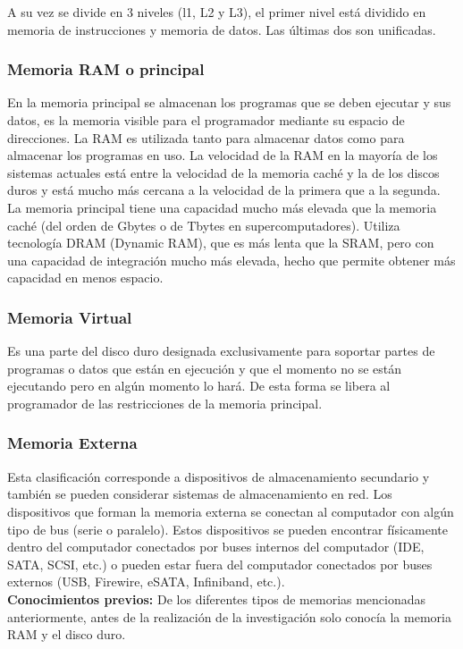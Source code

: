 \documentclass{article}
\begin{document}
A su vez se divide en 3 niveles (l1, L2 y L3), el primer nivel está dividido en memoria de instrucciones y memoria de datos. Las últimas dos son unificadas.

\subsubsection{Memoria RAM o principal}
En la memoria principal se almacenan los programas que se deben ejecutar y sus datos, es la memoria visible para el programador mediante su espacio de direcciones.
La RAM es utilizada tanto para almacenar datos como para almacenar los programas en uso. La velocidad de la RAM en la mayoría de los sistemas actuales está entre la velocidad de la memoria caché y la de los discos duros y está mucho más cercana a la velocidad de la primera que a la segunda.\cite{MIT} \break
La memoria principal tiene una capacidad mucho más elevada que la memoria caché (del orden de Gbytes o de Tbytes en supercomputadores). Utiliza tecnología DRAM (Dynamic RAM), que es más lenta que la SRAM, pero con una capacidad de integración mucho más elevada, hecho que permite obtener más capacidad en menos espacio.\cite{Estructura}

\subsubsection{Memoria Virtual}
Es una parte del disco duro designada exclusivamente para soportar partes de programas o datos que están en ejecución y que el momento no se están ejecutando pero en algún momento lo hará. De esta forma se libera al programador de las restricciones de la memoria principal.

\subsubsection{Memoria Externa}
Esta clasificación corresponde a dispositivos de almacenamiento secundario y también se pueden considerar sistemas de almacenamiento en red. Los dispositivos que forman la memoria externa se conectan al computador con algún tipo de bus (serie o paralelo). Estos dispositivos se pueden encontrar físicamente dentro del computador conectados por buses internos del computador (IDE, SATA, SCSI, etc.) o pueden estar fuera del computador conectados por buses externos (USB, Firewire, eSATA, Infiniband, etc.).\cite{Estructura}\\

\textbf{Conocimientos previos: }De los diferentes tipos de memorias mencionadas anteriormente, antes de la realización de la investigación solo conocía la memoria RAM y el disco duro.
\end{document}
